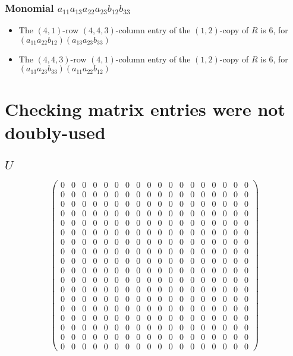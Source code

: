 \documentclass{article}
\begin{document}
\subsubsection{Monomial $ a_{11} a_{13} a_{22} a_{23} b_{12} b_{33} $}

\begin{itemize}
\item The $(4, 1)$-row $(4, 4, 3)$-column entry of the $ \left(1, 2\right) $-copy of $R$ is $ 6 $, for $( a_{11} a_{22} b_{12} )( a_{13} a_{23} b_{33} )$ 
\item The $(4, 4, 3)$-row $(4, 1)$-column entry of the $ \left(1, 2\right) $-copy of $R$ is $ 6 $, for $( a_{13} a_{23} b_{33} )( a_{11} a_{22} b_{12} )$ 
\end{itemize}
\section{Checking matrix entries were not doubly-used}
\subsection{$U$}
\[ \left(\begin{array}{rrrrrrrrrrrrrrrrrr}
0 & 0 & 0 & 0 & 0 & 0 & 0 & 0 & 0 & 0 & 0 & 0 & 0 & 0 & 0 & 0 & 0 & 0 \\
0 & 0 & 0 & 0 & 0 & 0 & 0 & 0 & 0 & 0 & 0 & 0 & 0 & 0 & 0 & 0 & 0 & 0 \\
0 & 0 & 0 & 0 & 0 & 0 & 0 & 0 & 0 & 0 & 0 & 0 & 0 & 0 & 0 & 0 & 0 & 0 \\
0 & 0 & 0 & 0 & 0 & 0 & 0 & 0 & 0 & 0 & 0 & 0 & 0 & 0 & 0 & 0 & 0 & 0 \\
0 & 0 & 0 & 0 & 0 & 0 & 0 & 0 & 0 & 0 & 0 & 0 & 0 & 0 & 0 & 0 & 0 & 0 \\
0 & 0 & 0 & 0 & 0 & 0 & 0 & 0 & 0 & 0 & 0 & 0 & 0 & 0 & 0 & 0 & 0 & 0 \\
0 & 0 & 0 & 0 & 0 & 0 & 0 & 0 & 0 & 0 & 0 & 0 & 0 & 0 & 0 & 0 & 0 & 0 \\
0 & 0 & 0 & 0 & 0 & 0 & 0 & 0 & 0 & 0 & 0 & 0 & 0 & 0 & 0 & 0 & 0 & 0 \\
0 & 0 & 0 & 0 & 0 & 0 & 0 & 0 & 0 & 0 & 0 & 0 & 0 & 0 & 0 & 0 & 0 & 0 \\
0 & 0 & 0 & 0 & 0 & 0 & 0 & 0 & 0 & 0 & 0 & 0 & 0 & 0 & 0 & 0 & 0 & 0 \\
0 & 0 & 0 & 0 & 0 & 0 & 0 & 0 & 0 & 0 & 0 & 0 & 0 & 0 & 0 & 0 & 0 & 0 \\
0 & 0 & 0 & 0 & 0 & 0 & 0 & 0 & 0 & 0 & 0 & 0 & 0 & 0 & 0 & 0 & 0 & 0 \\
0 & 0 & 0 & 0 & 0 & 0 & 0 & 0 & 0 & 0 & 0 & 0 & 0 & 0 & 0 & 0 & 0 & 0 \\
0 & 0 & 0 & 0 & 0 & 0 & 0 & 0 & 0 & 0 & 0 & 0 & 0 & 0 & 0 & 0 & 0 & 0 \\
0 & 0 & 0 & 0 & 0 & 0 & 0 & 0 & 0 & 0 & 0 & 0 & 0 & 0 & 0 & 0 & 0 & 0 \\
0 & 0 & 0 & 0 & 0 & 0 & 0 & 0 & 0 & 0 & 0 & 0 & 0 & 0 & 0 & 0 & 0 & 0 \\
0 & 0 & 0 & 0 & 0 & 0 & 0 & 0 & 0 & 0 & 0 & 0 & 0 & 0 & 0 & 0 & 0 & 0 \\
0 & 0 & 0 & 0 & 0 & 0 & 0 & 0 & 0 & 0 & 0 & 0 & 0 & 0 & 0 & 0 & 0 & 0
\end{array}\right) \]
\end{document}
